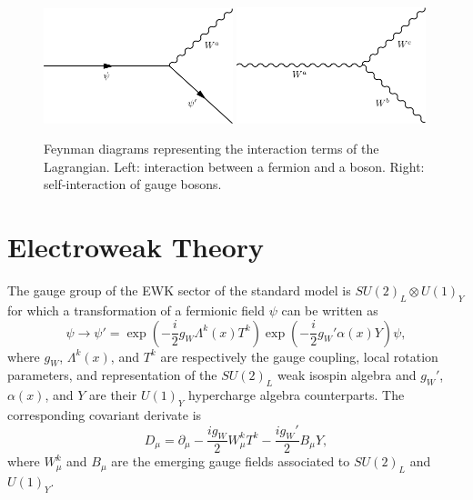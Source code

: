     \begin{figure}[h!]
      \centering
      \includegraphics[width=0.49\textwidth]{img/I-1-standard-model/diagram-fermion-boson.png}
      \includegraphics[width=0.49\textwidth]{img/I-1-standard-model/diagram-boson-boson.png}
      \caption{Feynman diagrams representing the interaction terms of the Lagrangian. Left: interaction between a fermion and a boson. Right: self-interaction of gauge bosons.}
      \label{fig:I-1-diagram}
    \end{figure}

  \section{Electroweak Theory}

    The gauge group of the EWK sector of the standard model is $ SU(2)_L \otimes U(1)_Y $ for which a transformation of a fermionic field $ \psi $ can be written as
    \begin{equation}
      \psi \rightarrow \psi' = \exp\left(- \frac{i}{2} g_W \Lambda^k(x) T^k \right) \exp\left(- \frac{i}{2} g_W' \alpha(x) Y \right) \psi ,
    \end{equation}
    where $ g_W $, $ \Lambda^k(x) $, and $ T^k $ are respectively the gauge coupling, local rotation parameters, and representation of the $ SU(2)_L $ weak isospin algebra and $ g_W' $, $ \alpha(x) $, and $ Y $ are their $ U(1)_Y $ hypercharge algebra counterparts. The corresponding covariant derivate is
    \begin{equation}
      D_\mu = \partial_\mu - \frac{i g_W}{2} W^k_\mu T^k - \frac{i g_W'}{2} B_\mu Y ,
    \end{equation}
    where $ W^k_\mu $ and $ B_\mu$ are the emerging gauge fields associated to $ SU(2)_L $ and $ U(1)_Y $. \\

